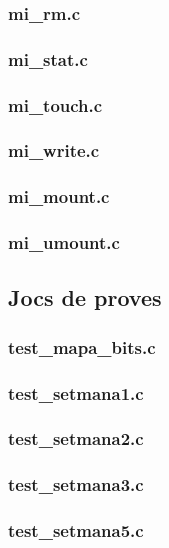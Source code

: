 \subsubsection{mi\_rm.c}

\subsubsection{mi\_stat.c}

\subsubsection{mi\_touch.c}

\subsubsection{mi\_write.c}

\subsubsection{mi\_mount.c}

\subsubsection{mi\_umount.c}


\subsection{Jocs de proves}


\subsubsection{test\_mapa\_bits.c}


\subsubsection{test\_setmana1.c}


\subsubsection{test\_setmana2.c}


\subsubsection{test\_setmana3.c}


\subsubsection{test\_setmana5.c}



\addtolength{\hoffset}{1.5cm}

